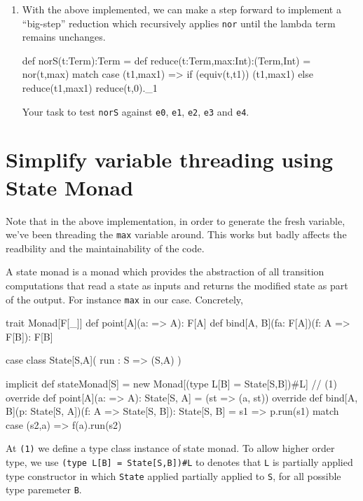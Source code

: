 \documentclass[10pt]{article}
\begin{document}
\begin{enumerate}
\item With the above implemented, we can make a step forward to implement a ``big-step'' reduction which recursively applies {\tt nor} until the lambda term remains unchanges.
\begin{code}
  def norS(t:Term):Term = {
    def reduce(t:Term,max:Int):(Term,Int) = nor(t,max) match {
      case (t1,max1) => {
        if (equiv(t,t1)) {
          (t1,max1)
        } else {
          reduce(t1,max1)
        }
      }
    }
    reduce(t,0)._1
  }
\end{code}
Your task to test {\tt norS} against {\tt e0}, {\tt e1}, {\tt e2}, {\tt e3} and {\tt e4}.

\end{enumerate}

\section{Simplify variable threading using State Monad}

Note that in the above implementation, in order to generate the fresh variable, we've been threading the {\tt max} variable around. This works but badly affects
the readbility and the maintainability of the code. 

A state monad is a monad which provides the abstraction of all transition computations that read a state as inputs and returns the modified state as part of the output. For instance {\tt max} in our case.
Concretely, 
\begin{code}
trait Monad[F[_]] {
  def point[A](a: => A): F[A] 
  def bind[A, B](fa: F[A])(f: A => F[B]): F[B]
} 

case class State[S,A]( run : S => (S,A) ) 

implicit def stateMonad[S] = new Monad[({type L[B] = State[S,B]})#L] { // (1)
  override def point[A](a: => A): State[S, A] =  (st => (a, st))             
  override def bind[A, B](p: State[S, A])(f: A => State[S, B]): State[S, B] =
    s1 => { p.run(s1) match {
         case (s2,a) => f(a).run(s2) 
      }
   }
}
\end{code}
%
At {\tt (1)} we define a type class instance of state monad. To allow higher order type, we use 
{\tt ({type L[B] = State[S,B]})\#L} to denotes that {\tt L} is partially applied type constructor 
in which {\tt State} applied partially applied to {\tt S}, for all possible type paremeter {\tt B}.
\end{document}
